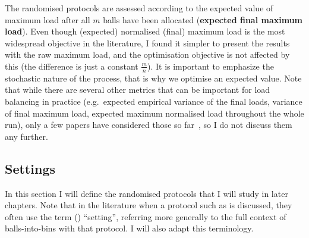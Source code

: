\begin{itemize}
    The randomised protocols are assessed according to the expected value of maximum load after all $m$ balls have been allocated (\textbf{expected final maximum load}). Even though (expected) normalised (final) maximum load is the most widespread objective in the literature, I found it simpler to present the results with the raw maximum load, and the optimisation objective is not affected by this (the difference is just a constant $\frac{m}{n}$). It is important to emphasize the stochastic nature of the process, that is why we optimise an expected value. Note that while there are several other metrics that can be important for load balancing in practice (e.g.\ expected empirical variance of the final loads, variance of final maximum load, expected maximum normalised load throughout the whole run), only a few papers have considered those so far~\cite{feldheim2021longtermthinning}, so I do not discuss them any further. 
    
\end{itemize}





\subsection{Settings} \label{settings}

In this section I will define the randomised protocols that I will study in later chapters. Note that in the literature when a protocol such as \TwoThinning is discussed, they often use the term (\TwoThinning) ``setting'', referring more generally to the full context of balls-into-bins with that protocol. I will also adapt this terminology.

